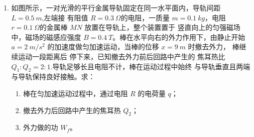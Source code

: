 \begin{enumerate}
\item 
{}
如图所示，一对光滑的平行金属导轨固定在同一水平面内，导轨间距 $ L=0.5 \ m $,左端接
有阻值 $ R=0.3 \ \Omega $的电阻，一质量 $ m=0.1 \ kg $，电阻 $ r=0.1 \ \Omega $的金属棒 $ MN $ 放置在导轨上，整个装置置于
竖直向上的匀强磁场中，磁场的磁感应强度 $ B=0.4 \ T $。棒在水平向右的外力作用下，由静止开始
$ a=2 \ m /s^{2} $ 的加速度做匀加速运动，当棒的位移 $ x=9 \ m $ 时撤去外力，
棒继续运动一段距离后 停下来，已知撤去外力前后回路中产生的
焦耳热比 $ Q_{1} : Q_{2} =2:1 $.导轨足够长且电阻不计，棒在运动过程中始终
与导轨垂直且两端与导轨保持良好接触。求：
\begin{enumerate}
\item
棒在匀加速运动过程中，通过电阻 $ R $ 的电荷量 $ q $；

\item 
撤去外力后回路中产生的焦耳热 $ Q_{2} $；
\item 
外力做的功 $ W_{f} $。


\end{enumerate}
\begin{figure}[h!]
\flushright

\end{figure}




\end{enumerate}
